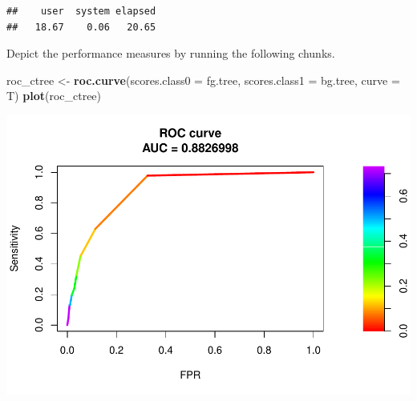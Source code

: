 \documentclass[]{article}
\newenvironment{Shaded}{\begin{snugshade}}{\end{snugshade}}
\newcommand{\CommentTok}[1]{\textcolor[rgb]{0.56,0.35,0.01}{\textit{#1}}}
\newcommand{\DataTypeTok}[1]{\textcolor[rgb]{0.13,0.29,0.53}{#1}}
\newcommand{\DecValTok}[1]{\textcolor[rgb]{0.00,0.00,0.81}{#1}}
\newcommand{\KeywordTok}[1]{\textcolor[rgb]{0.13,0.29,0.53}{\textbf{#1}}}
\newcommand{\NormalTok}[1]{#1}
\newcommand{\OperatorTok}[1]{\textcolor[rgb]{0.81,0.36,0.00}{\textbf{#1}}}
\newcommand{\StringTok}[1]{\textcolor[rgb]{0.31,0.60,0.02}{#1}}
\begin{document}
\begin{verbatim}
##    user  system elapsed 
##   18.67    0.06   20.65
\end{verbatim}

Depict the performance measures by running the following chunks.

\begin{Shaded}
\end{Shaded}

\begin{Shaded}
\end{Shaded}

\begin{Shaded}
\begin{Highlighting}[]
\NormalTok{roc_ctree <-}\StringTok{ }\KeywordTok{roc.curve}\NormalTok{(}\DataTypeTok{scores.class0 =}\NormalTok{ fg.tree,}
                       \DataTypeTok{scores.class1 =}\NormalTok{ bg.tree,}
                       \DataTypeTok{curve =}\NormalTok{ T)}
\KeywordTok{plot}\NormalTok{(roc_ctree) }
\end{Highlighting}
\end{Shaded}

\includegraphics{ml_analysis_lagged_with_imputation_files/figure-latex/unnamed-chunk-19-1.pdf}
\end{document}
